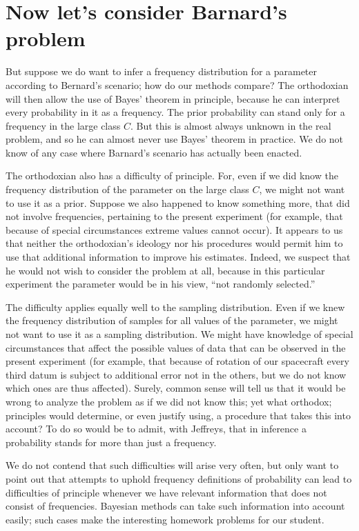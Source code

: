 \documentclass[12pt]{article}
\begin{document}
\section{Now let's consider Barnard's problem}

But suppose we do want to infer a frequency distribution
for a parameter according to Bernard's scenario; how do our
methods compare? The orthodoxian will then allow the use of
Bayes' theorem in principle, because he can interpret every
probability in it as a frequency. The prior probability can
stand only for a frequency in the large class $C$. But this is
almost always unknown in the real problem, and so he can almost never use Bayes' theorem in practice. We do not know of any case where Barnard's scenario has actually been enacted.

The orthodoxian also has a difficulty of principle. For, even if we did know the frequency distribution of the parameter on the large class $C$, we might not want to use it as a prior. Suppose we also happened to know something more, that did not involve frequencies, pertaining to the present experiment (for example, that because of special circumstances extreme values cannot occur). It appears to us that neither the orthodoxian's ideology nor his procedures would permit him to use that additional information to improve his estimates. Indeed, we suspect that he would not wish to consider the problem at all, because in this particular experiment the parameter would be in his view, ``not randomly selected.''

The difficulty applies equally well to the sampling distribution. Even if we knew the frequency distribution of samples for all values of the parameter, we might not want to use it as a sampling distribution. We might have knowledge of special circumstances that affect the possible values of data that can be observed in the present experiment (for example, that because of rotation of our spacecraft every third datum is subject to additional error not in the others, but we do not know which ones are thus affected). Surely, common sense will tell us that it would be wrong to analyze the problem as if we did not know this; yet what orthodox; principles would determine, or even justify using, a procedure that takes this into account? To do so would be to admit, with Jeffreys, that in inference a probability stands for more than just a frequency.

We do not contend that such difficulties will arise very often, but only want to point out that attempts to uphold frequency definitions of probability can lead to difficulties of principle whenever we have relevant information that does not consist of frequencies. Bayesian methods can take such information into account easily; such cases make the interesting homework problems for our student.
\end{document}

